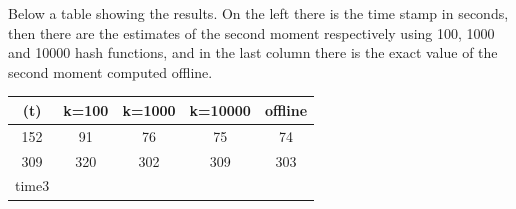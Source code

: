 \documentclass{article}
\begin{document}
Below a table showing the results. On the left there is the time stamp in seconds, then there are the estimates of the second moment respectively using 100, 1000 and 10000 hash functions, and in the last column there is the exact value of the second moment computed offline.          

\begin{center}
  \begin{tabular}{ | c || c | c | c || c |}
    \hline
    (t) & k=100 & k=1000 & k=10000 & offline \\ \hline
    152 & 91 & 76 & 75 & 74 \\ \hline
    309 & 320 & 302 & 309 & 303 \\ \hline
    time3 \\
    \hline
  \end{tabular}
\end{center}
\end{document}
